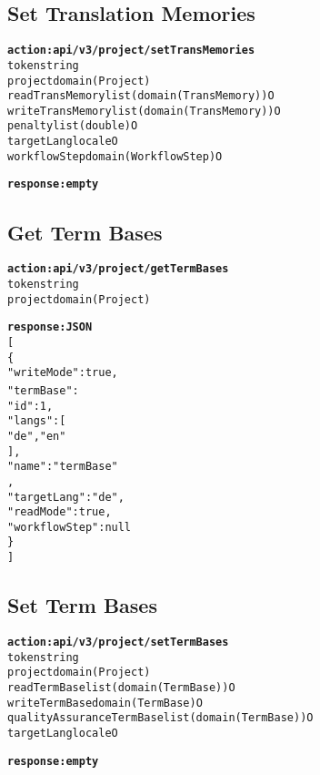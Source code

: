 \subsection{Set Translation Memories}
\begin{alltt}
\textbf{action: api/v3/project/setTransMemories}
token                       string
project                     domain(Project)
readTransMemory             list(domain(TransMemory))  O
writeTransMemory            list(domain(TransMemory))  O
penalty                     list(double)               O
targetLang                  locale                     O
workflowStep                domain(WorkflowStep)       O

\textbf{response: empty}
\end{alltt}


\subsection{Get Term Bases}
\begin{alltt}
\textbf{action: api/v3/project/getTermBases}
token                       string
project                     domain(Project)

\textbf{response: JSON}
[
\{
	"writeMode":true,
	"termBase":{
		"id":1,
		"langs":[
		"de", "en"
		],
		"name":"termBase"
	},
	"targetLang":"de",
	"readMode":true,
	"workflowStep":null
\}
]
\end{alltt}


\subsection{Set Term Bases}
\begin{alltt}
\textbf{action: api/v3/project/setTermBases}
token                       string
project                     domain(Project)
readTermBase                list(domain(TermBase))     O
writeTermBase               domain(TermBase)           O
qualityAssuranceTermBase    list(domain(TermBase))     O
targetLang                  locale                     O

\textbf{response: empty}
\end{alltt}



